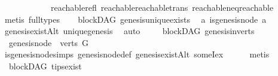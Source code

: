 \begin{isabellebody}
\ \ \ \ \ \ \ \ \ \ \ \ reachable{\isacharunderscore}{\kern0pt}refl\ reachable{\isacharunderscore}{\kern0pt}reachable{}{\isacharunderscore}{\kern0pt}trans\ reachable{\isacharunderscore}{\kern0pt}neq{\isacharunderscore}{\kern0pt}reachable{}\isanewline
\ \ \ \ \ \ \isamarkupfalse%
\ {\isacharparenleft}{\kern0pt}metis\ {\isacharparenleft}{\kern0pt}full{\isacharunderscore}{\kern0pt}types{\isacharparenright}{\kern0pt}{\isacharparenright}{\kern0pt}%
\endisatagproof
{\isafoldproof}%
%
\isadelimproof
\ \isanewline
%
\endisadelimproof
\isanewline
{}\isamarkupfalse%
\ {\isacharparenleft}{\kern0pt}\ blockDAG{\isacharparenright}{\kern0pt}\ genesis{\isacharunderscore}{\kern0pt}unique{\isacharunderscore}{\kern0pt}exists{\isacharcolon}{\kern0pt}\isanewline
\ \ {\isachardoublequoteopen}{\isasymexists}{\isacharbang}{\kern0pt}a{\isachardot}{\kern0pt}\ is{\isacharunderscore}{\kern0pt}genesis{\isacharunderscore}{\kern0pt}node\ a{\isachardoublequoteclose}\isanewline
%
\isadelimproof
\ \ %
\endisadelimproof
%
\isatagproof
{}\isamarkupfalse%
\ genesis{\isacharunderscore}{\kern0pt}existAlt\ unique{\isacharunderscore}{\kern0pt}genesis\ \isamarkupfalse%
\ auto%
\endisatagproof
{\isafoldproof}%
%
\isadelimproof
\ \ \isanewline
%
\endisadelimproof
\isanewline
{}\isamarkupfalse%
\ {\isacharparenleft}{\kern0pt}\ blockDAG{\isacharparenright}{\kern0pt}\ genesis{\isacharunderscore}{\kern0pt}in{\isacharunderscore}{\kern0pt}verts{\isacharcolon}{\kern0pt}\isanewline
\ \ {\isachardoublequoteopen}genesis{\isacharunderscore}{\kern0pt}node\ {\isasymin}\ verts\ G{\isachardoublequoteclose}\isanewline
%
\isadelimproof
\ \ \ \ %
\endisadelimproof
%
\isatagproof
{}\isamarkupfalse%
\ is{\isacharunderscore}{\kern0pt}genesis{\isacharunderscore}{\kern0pt}node{\isachardot}{\kern0pt}simps\ genesis{\isacharunderscore}{\kern0pt}node{\isacharunderscore}{\kern0pt}def\ genesis{\isacharunderscore}{\kern0pt}existAlt\ someI{}{\isacharunderscore}{\kern0pt}ex\isanewline
\ \ \ \ \isamarkupfalse%
\ metis%
\endisatagproof
{\isafoldproof}%
%
\isadelimproof
%
\endisadelimproof
%
\isadelimdocument
%
\endisadelimdocument
%
\isatagdocument
%
\isamarkuptrue%
%
\endisatagdocument
{\isafolddocument}%
%
\isadelimdocument
%
\endisadelimdocument
{}\isamarkupfalse%
\ {\isacharparenleft}{\kern0pt}\ blockDAG{\isacharparenright}{\kern0pt}\ tips{\isacharunderscore}{\kern0pt}exist{\isacharcolon}{\kern0pt}\ \isanewline

\end{isabellebody}
